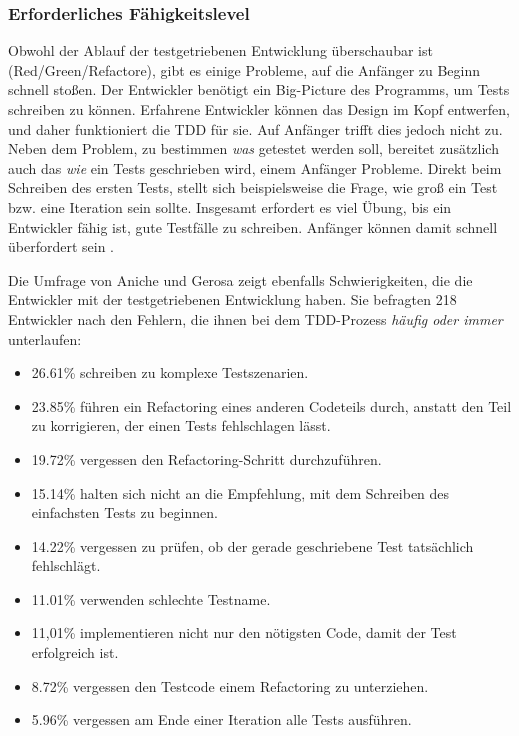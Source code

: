 \subsubsection{Erforderliches Fähigkeitslevel} Obwohl der Ablauf der testgetriebenen Entwicklung überschaubar ist (Red/Green/Refactore), gibt es einige Probleme, auf die Anfänger zu Beginn schnell stoßen. Der Entwickler benötigt ein Big-Picture des Programms, um Tests schreiben zu können. Erfahrene Entwickler können das Design im Kopf entwerfen, und daher funktioniert die TDD für sie. Auf Anfänger trifft dies jedoch nicht zu. Neben dem Problem, zu bestimmen \textit{was} getestet werden soll, bereitet zusätzlich auch das \textit{wie} ein Tests geschrieben wird, einem Anfänger Probleme. Direkt beim Schreiben des ersten Tests, stellt sich beispielsweise die Frage, wie groß ein Test bzw. eine Iteration sein sollte. Insgesamt erfordert es viel Übung, bis ein Entwickler fähig ist, gute Testfälle zu schreiben. Anfänger können damit schnell überfordert sein \cite{Kollanus2011CriticalDevelopment, Beck2003TestExample}.

Die Umfrage von Aniche und Gerosa \cite{Aniche2010MostDevelopers} zeigt ebenfalls Schwierigkeiten, die die Entwickler mit der testgetriebenen Entwicklung haben. Sie befragten 218 Entwickler nach den Fehlern, die ihnen bei dem TDD-Prozess \textit{häufig oder immer} unterlaufen:
\begin{itemize}
  \item 26.61\% schreiben zu komplexe Testszenarien.
  \item 23.85\% führen ein Refactoring eines anderen Codeteils durch, anstatt den Teil zu korrigieren, der einen Tests fehlschlagen lässt.
  \item 19.72\% vergessen den Refactoring-Schritt durchzuführen.
  \item 15.14\% halten sich nicht an die Empfehlung, mit dem Schreiben des einfachsten Tests zu beginnen.
  \item 14.22\% vergessen zu prüfen, ob der gerade geschriebene Test tatsächlich fehlschlägt.
  \item 11.01\% verwenden schlechte Testname.
  \item 11,01\% implementieren nicht nur den nötigsten Code, damit der Test erfolgreich ist.
  \item 8.72\% vergessen den Testcode einem Refactoring zu unterziehen.
  \item 5.96\% vergessen am Ende einer Iteration alle Tests ausführen.
\end{itemize}

